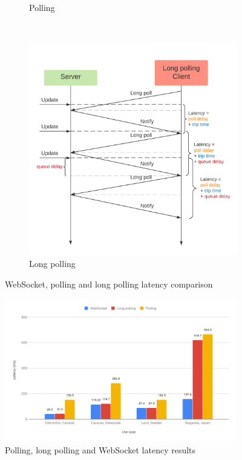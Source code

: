 \documentclass[12pt,a4paper,openright,twoside]{report}
\begin{document}
\begin{figure}[!htb]
\begin{subfigure}{.5\linewidth}
  \caption{Polling}
  \label{fig:latency_polling}
\end{subfigure}\\[1ex]
\begin{subfigure}{.6\linewidth}
  \centering
  \includegraphics[width=1.0\linewidth]{assets/latency_longpolling.png}
  \caption{Long polling}
  \label{fig:latency_longpolling}
\end{subfigure}%
\caption{WebSocket, polling and long polling latency comparison}
\label{fig:latency}
\end{figure}

\begin{figure}[htbp]
\centering
\includegraphics[width=0.9\textwidth]{assets/latency_chart.png}
\caption{Polling, long polling and WebSocket latency results}
\label{fig:latency_chart}
\end{figure}
\end{document}
